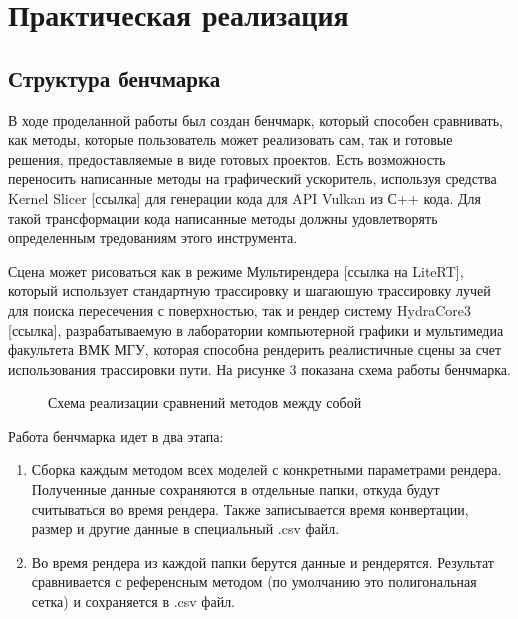 \documentclass[a4paper,hidelinks,12pt]{article}
\begin{document}
\newpage

\section{Практическая реализация}

\subsection{Структура бенчмарка}

В ходе проделанной работы был создан бенчмарк, который способен сравнивать, как методы, которые пользователь может реализовать сам, так и готовые решения, 
предоставляемые в виде готовых проектов. Есть возможность переносить написанные методы на графический ускоритель, используя средства Kernel Slicer [ссылка] для генерации кода для 
API Vulkan из С++ кода. Для такой трансформации кода написанные методы должны удовлетворять определенным тредованиям этого инструмента. 

Сцена может рисоваться 
как в режиме Мультирендера [ссылка на LiteRT], который использует стандартную трассировку и шагаюшую трассировку лучей для поиска пересечения с поверхностью, так и рендер систему 
HydraCore3 [ссылка], разрабатываемую в лаборатории компьютерной графики и мультимедиа факультета ВМК МГУ, которая способна рендерить реалистичные сцены
за счет использования трассировки пути. На рисунке 3 показана схема работы бенчмарка.

\begin{figure}[h]
  \centering
  \caption{Схема реализации сравнений методов между собой}
  \label{fig:my_label}
\end{figure}

\newpage

Работа бенчмарка идет в два этапа:
\begin{enumerate}
	\item Сборка каждым методом всех моделей с конкретными параметрами рендера. Полученные данные сохраняются в отдельные папки, откуда будут считываться во время рендера. Также записывается 
	время конвертации, размер и другие данные в специальный .csv файл.
	\item Во время рендера из каждой папки берутся данные и рендерятся. Результат сравнивается с референсным методом (по умолчанию это полигональная сетка) и сохраняется в .csv файл.
\end{enumerate}
\end{document}
